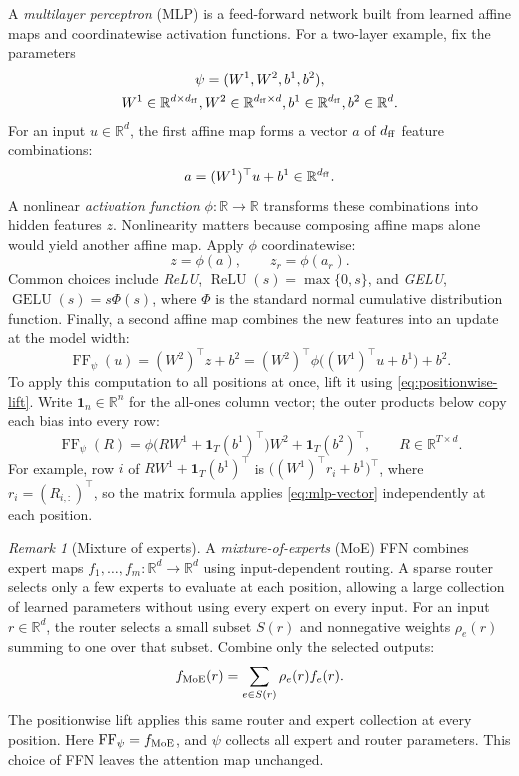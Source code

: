 \documentclass[11pt,twoside]{article}
\newcommand{\R}{\mathbb R}
\theoremstyle{plain}
\theoremstyle{definition}
\theoremstyle{remark}
\newtheorem{remark}{Remark}[section]
\begin{document}
A \emph{multilayer perceptron} (MLP) is a feed-forward network built from
learned affine maps and coordinatewise activation functions. For a two-layer
example, fix the parameters
\begin{equation}
\begin{gathered}
\psi=(W^1,W^2,b^1,b^2),\\
W^1\in\R^{d\times d_{\rm ff}},\quad
W^2\in\R^{d_{\rm ff}\times d},\quad
b^1\in\R^{d_{\rm ff}},\quad b^2\in\R^d.
\end{gathered}
\label{eq:mlp-parameters}
\end{equation}
For an input $u\in\R^d$, the first affine map forms a vector $a$ of
$d_{\rm ff}$ feature combinations:
\[
a=(W^1)^\top u+b^1\in\R^{d_{\rm ff}}.
\]
A nonlinear \emph{activation function} $\phi:\R\to\R$ transforms these combinations
into hidden features $z$. Nonlinearity matters because composing affine maps
alone would yield another affine map. Apply $\phi$ coordinatewise:
\[
z=\phi(a),\qquad z_r=\phi(a_r).
\]
Common choices include \emph{ReLU}, $\operatorname{ReLU}(s)=\max\{0,s\}$, and
\emph{GELU}, $\operatorname{GELU}(s)=s\Phi(s)$, where $\Phi$ is the standard normal
cumulative distribution function. Finally, a second affine map combines
the new features into an update at the model width:
\begin{equation}
\operatorname{FF}_\psi(u)
= (W^2)^\top z+b^2
= (W^2)^\top\phi\bigl((W^1)^\top u+b^1\bigr)+b^2.
\label{eq:mlp-vector}
\end{equation}
To apply this computation to all positions at once, lift it using
\eqref{eq:positionwise-lift}. Write $\mathbf 1_n\in\R^n$ for the all-ones
column vector; the outer products below copy each bias into every row:
\begin{equation}
\operatorname{FF}_\psi(R)
=\phi\bigl(RW^1+\mathbf 1_T(b^1)^\top\bigr)W^2
+\mathbf 1_T(b^2)^\top,
\qquad R\in\R^{T\times d}.
\label{eq:feed-forward-map}
\end{equation}
For example, row $i$ of $RW^1+\mathbf 1_T(b^1)^\top$ is
$\bigl((W^1)^\top r_i+b^1\bigr)^\top$, where
$r_i=(R_{i,:})^\top$, so the matrix formula applies
\eqref{eq:mlp-vector} independently at each position.

\begin{remark}[Mixture of experts]
\label{rem:moe}
A \emph{mixture-of-experts} (MoE) FFN combines expert maps
$f_1,\ldots,f_m:\R^d\to\R^d$ using input-dependent routing.
A sparse router selects only a few experts to evaluate at each position,
allowing a large collection of learned parameters without using every expert
on every input. For an input $r\in\R^d$, the router selects a small subset $S(r)$ and
nonnegative weights $\rho_e(r)$ summing to one over that subset. Combine
only the selected outputs:
\begin{equation}
f_{\rm MoE}(r)=\sum_{e\in S(r)}\rho_e(r)f_e(r).
\end{equation}
The positionwise lift applies
this same router and expert collection at every position. Here
$\operatorname{FF}_\psi=f_{\rm MoE}$, and $\psi$ collects all expert and router
parameters. This choice of FFN leaves the attention map unchanged.
\end{remark}
\end{document}
